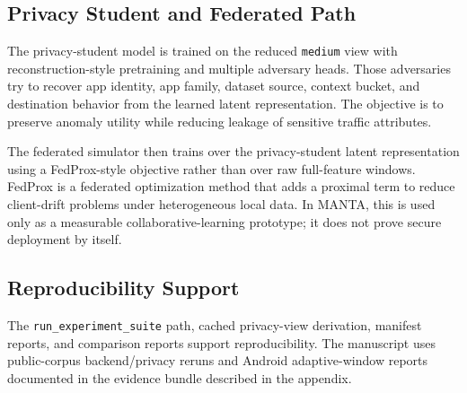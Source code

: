 \subsection{Privacy Student and Federated Path}
The privacy-student model is trained on the reduced \texttt{medium} view with reconstruction-style
pretraining and multiple adversary heads. Those adversaries try to recover app identity, app
family, dataset source, context bucket, and destination behavior from the learned latent
representation. The objective is to preserve anomaly utility while reducing leakage of sensitive
traffic attributes.

The federated simulator then trains over the privacy-student latent representation using a
FedProx-style objective \citep{fedprox_2020} rather than over raw full-feature windows. FedProx is a
federated optimization method that adds a proximal term to reduce client-drift problems under
heterogeneous local data. In MANTA, this is used only as a measurable collaborative-learning
prototype; it does not prove secure deployment by itself.

\subsection{Reproducibility Support}
The \texttt{run\_experiment\_suite} path, cached privacy-view derivation, manifest reports, and
comparison reports support reproducibility. The manuscript uses public-corpus backend/privacy
reruns and Android adaptive-window reports documented in the evidence bundle described in the
appendix.
